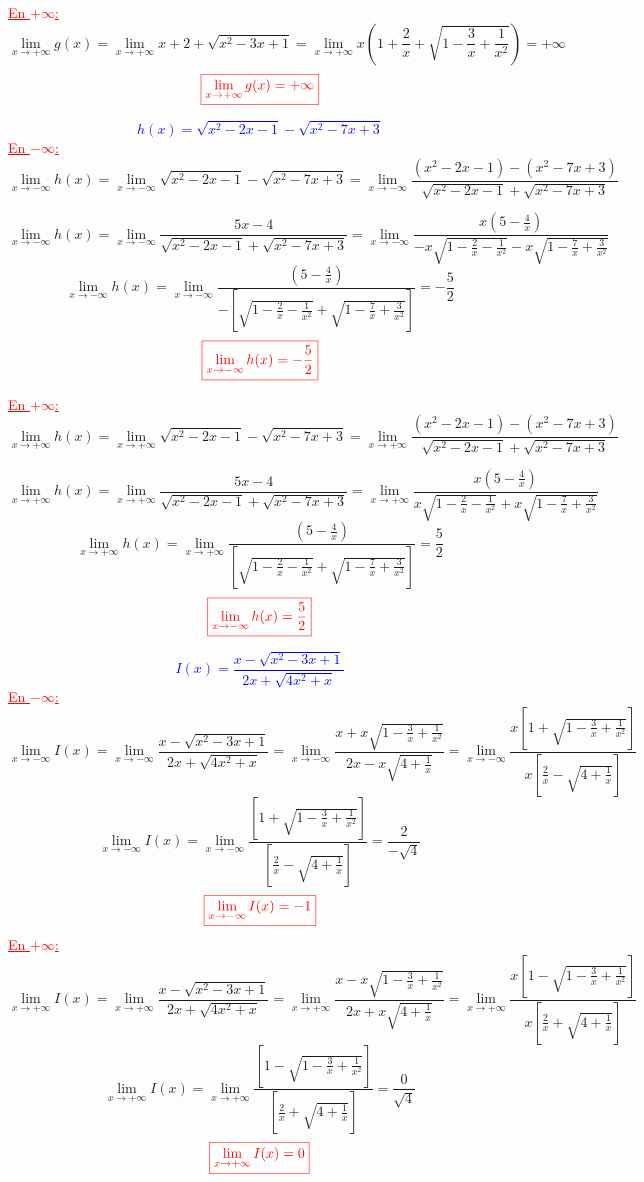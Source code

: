 \documentclass{article}
\begin{document}
\textcolor{red}{\underline{En $+\infty$:}}
\[\lim_{x \to +\infty}g(x)=\lim_{x \to +\infty}x+2+\sqrt{x^{2}-3x+1}=\lim_{x \to +\infty}x\left(1+\frac{2}{x}+\sqrt{1-\frac{3}{x}+\frac{1}{x^{2}}}\right)=+\infty\] 
\[\textcolor{red}{\boxed{\lim_{x \to +\infty}g(x)=+\infty}}\]

\textcolor{blue}{\[h(x)=\sqrt{x^{2}-2x-1}-\sqrt{x^{2}-7x+3}\]}
\textcolor{red}{\underline{En $-\infty$:}}
\[\lim_{x \to -\infty}h(x)=\lim_{x \to -\infty}\sqrt{x^{2}-2x-1}-\sqrt{x^{2}-7x+3}=\lim_{x \to -\infty}\frac{\left( x^{2}-2x-1\right) -\left( x^{2}-7x+3\right)}{\sqrt{x^{2}-2x-1}+\sqrt{x^{2}-7x+3}}\]
 
\[\lim_{x \to -\infty}h(x)=\lim_{x \to -\infty}\frac{5x-4}{\sqrt{x^{2}-2x-1}+\sqrt{x^{2}-7x+3}}=\lim_{x \to -\infty}\frac{x(5-\frac{4}{x})}{-x\sqrt{1-\frac{2}{x}-\frac{1}{x^{2}}}-x\sqrt{1-\frac{7}{x}+\frac{3}{x^{2}}}}\]
\[\lim_{x \to -\infty}h(x)=\lim_{x \to -\infty}\frac{(5-\frac{4}{x})}{-\left[\sqrt{1-\frac{2}{x}-\frac{1}{x^{2}}}+\sqrt{1-\frac{7}{x}+\frac{3}{x^{2}}}\right]}=-\frac{5}{2}\] 
\[\textcolor{red}{\boxed{\lim_{x \to -\infty}h(x)=-\frac{5}{2}}}\]

\textcolor{red}{\underline{En $+\infty$:}}
\[\lim_{x \to +\infty}h(x)=\lim_{x \to +\infty}\sqrt{x^{2}-2x-1}-\sqrt{x^{2}-7x+3}=\lim_{x \to +\infty}\frac{\left( x^{2}-2x-1\right) -\left( x^{2}-7x+3\right)}{\sqrt{x^{2}-2x-1}+\sqrt{x^{2}-7x+3}}\]
 
\[\lim_{x \to +\infty}h(x)=\lim_{x \to +\infty}\frac{5x-4}{\sqrt{x^{2}-2x-1}+\sqrt{x^{2}-7x+3}}=\lim_{x \to +\infty}\frac{x(5-\frac{4}{x})}{x\sqrt{1-\frac{2}{x}-\frac{1}{x^{2}}}+x\sqrt{1-\frac{7}{x}+\frac{3}{x^{2}}}}\]
\[\lim_{x \to +\infty}h(x)=\lim_{x \to +\infty}\frac{(5-\frac{4}{x})}{\left[\sqrt{1-\frac{2}{x}-\frac{1}{x^{2}}}+\sqrt{1-\frac{7}{x}+\frac{3}{x^{2}}}\right]}=\frac{5}{2}\] 
\[\textcolor{red}{\boxed{\lim_{x \to -\infty}h(x)=\frac{5}{2}}}\]

\textcolor{blue}{\[I(x)=\frac{x-\sqrt{x^{2}-3x+1}}{2x+\sqrt{4x^{2}+x}}\]}
\textcolor{red}{\underline{En $-\infty$:}}
\[\lim_{x \to -\infty}I(x)=\lim_{x \to -\infty}\frac{x-\sqrt{x^{2}-3x+1}}{2x+\sqrt{4x^{2}+x}}=\lim_{x \to -\infty}\frac{x+x\sqrt{1-\frac{3}{x}+\frac{1}{x^{2}}}}{2x-x\sqrt{4+\frac{1}{x}}}=\lim_{x \to -\infty}\frac{x\left[1+\sqrt{1-\frac{3}{x}+\frac{1}{x^{2}}}\right]}{x\left[ \frac{2}{x}-\sqrt{4+\frac{1}{x}}\right]}\]
\[\lim_{x \to -\infty}I(x)=\lim_{x \to -\infty}\frac{\left[1+\sqrt{1-\frac{3}{x}+\frac{1}{x^{2}}}\right]}{\left[ \frac{2}{x}-\sqrt{4+\frac{1}{x}}\right]}=\frac{2}{-\sqrt{4}}\]
\[\textcolor{red}{\boxed{\lim_{x \to -\infty}I(x)=-1}}\]
\textcolor{red}{\underline{En $+\infty$:}}
\[\lim_{x \to +\infty}I(x)=\lim_{x \to +\infty}\frac{x-\sqrt{x^{2}-3x+1}}{2x+\sqrt{4x^{2}+x}}=\lim_{x \to +\infty}\frac{x-x\sqrt{1-\frac{3}{x}+\frac{1}{x^{2}}}}{2x+x\sqrt{4+\frac{1}{x}}}=\lim_{x \to +\infty}\frac{x\left[1-\sqrt{1-\frac{3}{x}+\frac{1}{x^{2}}}\right]}{x\left[ \frac{2}{x}+\sqrt{4+\frac{1}{x}}\right]}\]
\[\lim_{x \to +\infty}I(x)=\lim_{x \to +\infty}\frac{\left[1-\sqrt{1-\frac{3}{x}+\frac{1}{x^{2}}}\right]}{\left[ \frac{2}{x}+\sqrt{4+\frac{1}{x}}\right]}=\frac{0}{\sqrt{4}}\]
\[\textcolor{red}{\boxed{\lim_{x \to +\infty}I(x)=0}}\]
\end{document}
